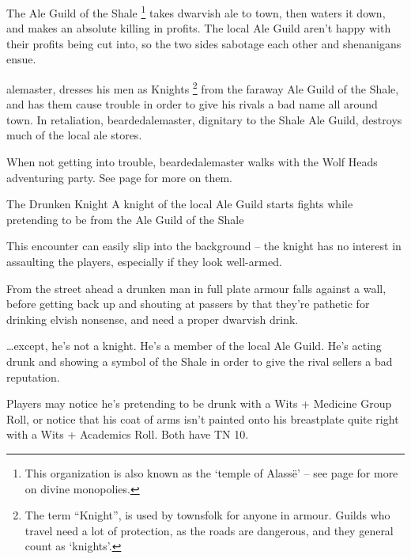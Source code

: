 \begin{multicols}{2}

\label{troubleAle}

\startcontents[sq]

\sqminitoc

\noindent
The Ale Guild of the Shale%
\footnote{This organization is also known as the `temple of Alass\"{e}' -- see page \pageref{guilds} for more on divine monopolies.}
takes dwarvish ale to \gls{town}, then waters it down, and makes an absolute killing in profits.
The local Ale Guild aren't happy with their profits being cut into, so the two sides sabotage each other and shenanigans ensue.

\Gls{alemaster}, dresses his men as Knights%
\footnote{The term ``Knight'', is used by townsfolk for anyone in armour.
Guilds who travel need a lot of protection, as the roads are dangerous, and they general count as `knights'.}
from the faraway Ale Guild of the Shale, and has them cause trouble in order to give his rivals a bad name all around \gls{town}.
In retaliation, \gls{beardedalemaster}, dignitary to the Shale Ale Guild, destroys much of the local ale stores.

When not getting into trouble, \Gls{beardedalemaster} walks with the Wolf Heads adventuring party.
See page \pageref{beardedalemaster} for more on them.

{The Drunken Knight}%
{A knight of the local Ale Guild starts fights while pretending to be from the Ale Guild of the Shale}%

This encounter can easily slip into the background -- the knight has no interest in assaulting the players, especially if they look well-armed.

\begin{boxtext}

	From the street ahead a drunken man in full plate armour falls against a wall, before getting back up and shouting at passers by that they're pathetic for drinking elvish nonsense, and need a proper dwarvish drink.

\end{boxtext}

\ldots except, he's not a knight.
He's a member of the local Ale Guild.
He's acting drunk and showing a symbol of the Shale in order to give the rival sellers a bad reputation.

Players may notice he's pretending to be drunk with a Wits + Medicine Group Roll, or notice that his coat of arms isn't painted onto his breastplate quite right with a Wits + Academics Roll.
Both have TN 10.


\end{multicols}
